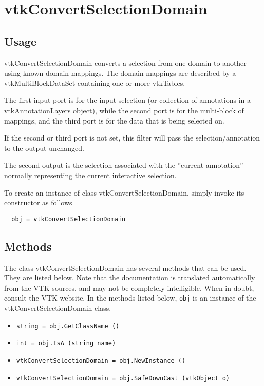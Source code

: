 \section{vtkConvertSelectionDomain}

\subsection{Usage}

 vtkConvertSelectionDomain converts a selection from one domain to another
 using known domain mappings. The domain mappings are described by a
 vtkMultiBlockDataSet containing one or more vtkTables.

 The first input port is for the input selection (or collection of annotations
 in a vtkAnnotationLayers object), while the second port
 is for the multi-block of mappings, and the third port is for the
 data that is being selected on.

 If the second or third port is not set, this filter will pass the
 selection/annotation to the output unchanged.

 The second output is the selection associated with the ''current annotation''
 normally representing the current interactive selection.

To create an instance of class vtkConvertSelectionDomain, simply
invoke its constructor as follows
\begin{verbatim}
  obj = vtkConvertSelectionDomain
\end{verbatim}
\subsection{Methods}

The class vtkConvertSelectionDomain has several methods that can be used.
  They are listed below.
Note that the documentation is translated automatically from the VTK sources,
and may not be completely intelligible.  When in doubt, consult the VTK website.
In the methods listed below, \verb|obj| is an instance of the vtkConvertSelectionDomain class.
\begin{itemize}
\item  \verb|string = obj.GetClassName ()|

\item  \verb|int = obj.IsA (string name)|

\item  \verb|vtkConvertSelectionDomain = obj.NewInstance ()|

\item  \verb|vtkConvertSelectionDomain = obj.SafeDownCast (vtkObject o)|

\end{itemize}
